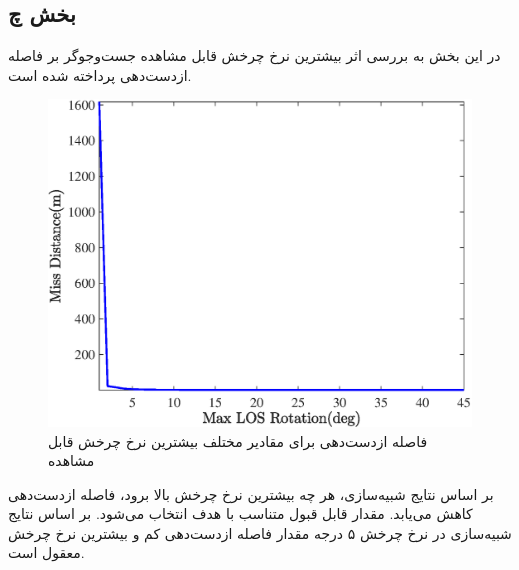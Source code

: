 \subsection{بخش چ}
در این بخش به بررسی اثر بیشترین نرخ چرخش قابل مشاهده جست‌وجوگر بر فاصله‌ ازدست‌دهی پرداخته شده است.
\begin{figure}[H]
	\centering
	\includegraphics[width=.75\linewidth]{../Figure/Q1/g/MD}
	\caption{فاصله ازدست‌دهی برای مقادیر مختلف بیشترین نرخ چرخش قابل مشاهده}
\end{figure}
بر اساس نتایج شبیه‌سازی، هر چه بیشترین نرخ چرخش بالا برود، فاصله ازدست‌دهی کاهش می‌یابد. مقدار قابل قبول متناسب با هدف انتخاب می‌شود. بر اساس نتایج شبیه‌سازی در نرخ چرخش ۵ درجه مقدار فاصله ازدست‌دهی کم و بیشترین نرخ چرخش معقول است.